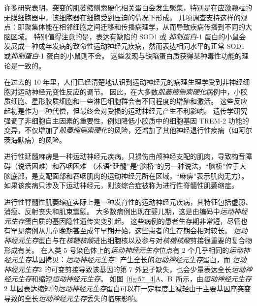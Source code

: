 许多研究表明，突变的肌萎缩侧索硬化相关蛋白会发生聚集，特别是在应激颗粒的无膜细胞器中，该细胞器在细胞受到压迫的情况下形成。
几项调查支持这样的观点：即聚集体能在相邻细胞之间迁移和传播病理学，从而导致疾病传播到不同的大脑区域。
特别值得注意的是，表达有缺陷的 SOD1 或 \textit{抑制蛋白}-1 蛋白的小鼠会发展成一种成年发病的致命性运动神经元疾病，然而表达相同水平的正常 SOD1 或\textit{抑制蛋白}-1 蛋白的小鼠则不会。
这些发现与缺陷蛋白质获得某种毒性功能的理论是一致的。


在过去的 10 年里，人们已经清楚地认识到运动神经元的病理生理学受到非神经细胞对运动神经元变性反应的调节。
因此，在大多数\textit{肌萎缩侧索硬化}病例中，小胶质细胞、星形胶质细胞和一些淋巴细胞群会有不同程度的增殖和激活。
这些反应起初是作为一种代偿，但最终会对受损的运动神经元产生不利影响。
遗传学研究强调了非细胞自主因素的重要性，例如降低小胶质中的细胞基因 TREM-2 功能的变异，不仅增加了\textit{肌萎缩侧索硬化}的风险，还增加了其他神经退行性疾病（如阿尔茨海默病）的风险。


进行性延髓麻痹是一种运动神经元疾病，只损伤由颅神经支配的肌肉，导致构音障碍（说话困难）和吞咽困难
（术语“延髓”是“脑桥”的另一种说法，“脑桥”位于大脑底部，是支配面部和吞咽肌肉的运动神经元所在区域，“麻痹”表示肌肉无力）。
如果该疾病只涉及下运动神经元，则该综合症被称为进行性脊髓性肌萎缩症。


进行性脊髓性肌萎缩症实际上是一种发育性的运动神经元疾病，其特征包括虚弱、消瘦、反射丧失和肌束震颤。
大多数病例出现在婴儿期，这是由编码中\textit{运动神经元生存}蛋白质的基因隐性遗传突变引起。
这些病例的患者生存期非常短，尽管也有罕见病例从儿童晚期甚至成年早期开始，这些患者的生存期会相对较长。
\textit{运动神经元生存}蛋白与在\textit{核糖核酸}进出细胞核以及参与对\textit{核糖核酸}剪接很重要的复合物形成有关。
在人类 5 号染色体上的\textit{运动神经元生存}位点有 2 个几乎相同的\textit{运动神经元生存}基因拷贝：\textit{运动神经元生存}1 产生全长的\textit{运动神经元生存}蛋白，而 \textit{运动神经元生存}2 的可变剪接导致该基因的第 7 外显子缺失，也会少量表达全长\textit{运动神经元生存}和缩短\textit{运动神经元生存}。
如图~\ref{fig:57_4}A、B~所示，由\textit{运动神经元生存}2 基因表达缩短的\textit{运动神经元生存}蛋白可以在一定程度上减轻由于主要基因座突变导致的全长\textit{运动神经元生存}丢失的临床影响。


